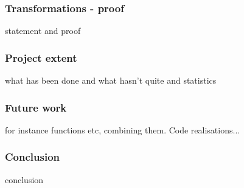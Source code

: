 \begin{frame}[fragile]
\frametitle{Transformations - proof}

statement and proof

\end{frame}


\begin{frame}[fragile]
\frametitle{Project extent}

what has been done and what hasn't quite and statistics

\end{frame}


\begin{frame}[fragile]
\frametitle{Future work}

for instance functions etc, combining them. Code realisations...

\end{frame}


\begin{frame}[fragile]
\frametitle{Conclusion}

conclusion

\end{frame}




